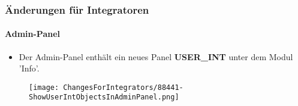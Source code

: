 
\begin{frame}[fragile]
	\frametitle{Änderungen für Integratoren}
	\framesubtitle{Admin-Panel}

	\begin{itemize}
		\item Der Admin-Panel enthält ein neues Panel \textbf{USER\_INT} unter dem Modul 'Info'.
	\end{itemize}

	\begin{figure}
		\texttt{[image: ChangesForIntegrators/88441-ShowUserIntObjectsInAdminPanel.png]}
	\end{figure}

\end{frame}

